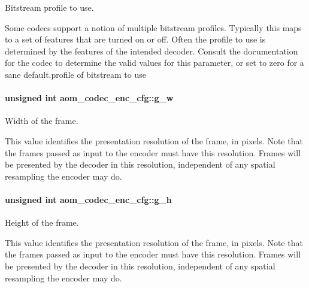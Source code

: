 Bitstream profile to use. 

Some codecs support a notion of multiple bitstream profiles. Typically this maps to a set of features that are turned on or off. Often the profile to use is determined by the features of the intended decoder. Consult the documentation for the codec to determine the valid values for this parameter, or set to zero for a sane default.\+profile of bitstream to use 
\paragraph[{\texorpdfstring{g\+\_\+w}{g_w}}]{\setlength{\rightskip}{0pt plus 5cm}unsigned int aom\+\_\+codec\+\_\+enc\+\_\+cfg\+::g\+\_\+w}\hypertarget{structaom__codec__enc__cfg_a80cb459c5ef3c7e1516f617c4c9d6eab}{}\label{structaom__codec__enc__cfg_a80cb459c5ef3c7e1516f617c4c9d6eab}


Width of the frame. 

This value identifies the presentation resolution of the frame, in pixels. Note that the frames passed as input to the encoder must have this resolution. Frames will be presented by the decoder in this resolution, independent of any spatial resampling the encoder may do. 
\paragraph[{\texorpdfstring{g\+\_\+h}{g_h}}]{\setlength{\rightskip}{0pt plus 5cm}unsigned int aom\+\_\+codec\+\_\+enc\+\_\+cfg\+::g\+\_\+h}\hypertarget{structaom__codec__enc__cfg_a37b0f57b63bec8d133df8901d4407ee6}{}\label{structaom__codec__enc__cfg_a37b0f57b63bec8d133df8901d4407ee6}


Height of the frame. 

This value identifies the presentation resolution of the frame, in pixels. Note that the frames passed as input to the encoder must have this resolution. Frames will be presented by the decoder in this resolution, independent of any spatial resampling the encoder may do. 

